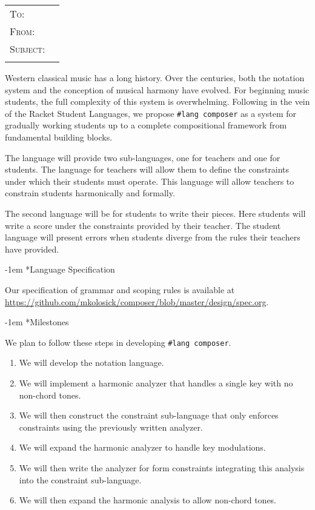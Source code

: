 \documentclass{article}
\makeatletter
\newcommand{\makeheader}{%
  \noindent
  \begin{tabular}{@{}ll}
    \ifdefined\@recipient
      \textsc{To: } & \@recipient{} \\
    \fi
    \ifdefined\@from
      \textsc{From: } & \@from{} \\
    \fi
    \ifdefined\@subject
      \textsc{Subject: } & \@subject{} \\
    \fi
  \end{tabular}
  \vspace{1\baselineskip}
}
\renewcommand\section{\@startsection {section}{1}{\z@}%
    {\z@}
    {-1em}%
    {\itshape}}
\newcommand{\composer}{\texttt{\#lang composer}}
\makeatother
\begin{document}
\makeheader{}

Western classical music has a long history. Over the centuries, both the
notation system and the conception of musical harmony have evolved. For
beginning music students, the full complexity of this system is overwhelming.
Following in the vein of the Racket Student Languages, we propose \composer{} as
a system for gradually working students up to a complete compositional framework
from fundamental building blocks.

The language will provide two sub-languages, one for teachers and one for
students. The language for teachers will allow them to define the
constraints under which their students must operate. This language will allow
teachers to constrain students harmonically and formally.

The second language will be for students to write their pieces. Here students
will write a score under the constraints provided by their teacher. The student
language will present errors when students diverge from the rules their teachers
have provided.

\section*{Language Specification}

Our specification of grammar and scoping rules is available at
\url{https://github.com/mkolosick/composer/blob/master/design/spec.org}.

\section*{Milestones}

We plan to follow these steps in developing \composer{}.
\begin{enumerate}
  \item We will develop the notation language.
  \item We will implement a harmonic analyzer that handles a single key with no
    non-chord tones.
  \item We will then construct the constraint sub-language that only enforces
    constraints using the previously written analyzer.
  \item We will expand the harmonic analyzer to handle key modulations.
  \item We will then write the analyzer for form constraints integrating this
    analysis into the constraint sub-language.
  \item We will then expand the harmonic analysis to allow non-chord tones.
\end{enumerate}
\end{document}
